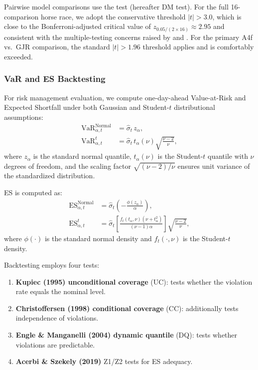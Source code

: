 \documentclass[12pt,a4paper]{article}
\begin{document}
Pairwise model comparisons use the \citet{diebold2002} test (hereafter DM test). For the full 16-comparison horse race, we adopt the conservative threshold $|t| > 3.0$, which is close to the Bonferroni-adjusted critical value of $z_{0.05/(2 \times 16)} \approx 2.95$ and consistent with the multiple-testing concerns raised by \citet{white2000} and \citet{harvey2016}. For the primary A4f vs.\ GJR comparison, the standard $|t| > 1.96$ threshold applies and is comfortably exceeded.

\subsubsection{VaR and ES Backtesting}

For risk management evaluation, we compute one-day-ahead Value-at-Risk and Expected Shortfall under both Gaussian and Student-$t$ distributional assumptions:
\begin{align}
\mathrm{VaR}_{\alpha,t}^{\text{Normal}} &= \hat{\sigma}_t \, z_\alpha, \label{eq:var_normal} \\
\mathrm{VaR}_{\alpha,t}^{t} &= \hat{\sigma}_t \, t_\alpha(\nu) \sqrt{\frac{\nu-2}{\nu}}, \label{eq:var_t}
\end{align}
where $z_\alpha$ is the standard normal quantile, $t_\alpha(\nu)$ is the Student-$t$ quantile with $\nu$ degrees of freedom, and the scaling factor $\sqrt{(\nu-2)/\nu}$ ensures unit variance of the standardized distribution.

ES is computed as:
\begin{align}
\mathrm{ES}_{\alpha,t}^{\text{Normal}} &= \hat{\sigma}_t \left(-\frac{\phi(z_\alpha)}{\alpha}\right), \label{eq:es_normal} \\
\mathrm{ES}_{\alpha,t}^{t} &= \hat{\sigma}_t \left[\frac{f_t(t_\alpha, \nu)(\nu + t_\alpha^2)}{(\nu-1)\alpha}\right] \sqrt{\frac{\nu-2}{\nu}}, \label{eq:es_t}
\end{align}
where $\phi(\cdot)$ is the standard normal density and $f_t(\cdot, \nu)$ is the Student-$t$ density.

Backtesting employs four tests:
\begin{enumerate}
\item \textbf{Kupiec (1995) unconditional coverage} (UC): tests whether the violation rate equals the nominal level.
\item \textbf{Christoffersen (1998) conditional coverage} (CC): additionally tests independence of violations.
\item \textbf{Engle \& Manganelli (2004) dynamic quantile} (DQ): tests whether violations are predictable.
\item \textbf{Acerbi \& Szekely (2019)} Z1/Z2 tests for ES adequacy.
\end{enumerate}
\end{document}
